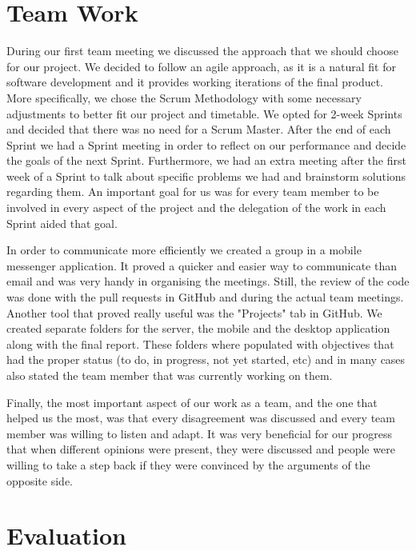 \documentclass[11pt]{article}
\begin{document}

\section{Team Work}

During our first team meeting we discussed the approach that we should choose for our project. We decided to follow an agile approach, as it is a natural fit for software development and it provides working iterations of the final product. More specifically, we chose the Scrum Methodology \cite{rising:00} with some necessary adjustments to better fit our project and timetable. We opted for 2-week Sprints and decided that there was no need for a Scrum Master. After the end of each Sprint we had a Sprint meeting in order to reflect on our performance and decide the goals of the next Sprint. Furthermore, we had an extra meeting after the first week of a Sprint to talk about specific problems we had and brainstorm solutions regarding them. An important goal for us was for every team member to be involved in every aspect of the project and the delegation of the work in each Sprint aided that goal.

In order to communicate more efficiently we created a group in a mobile messenger application. It proved a quicker and easier way to communicate than email and was very handy in organising the meetings. Still, the review of the code was done with the pull requests in GitHub and during the actual team meetings. Another tool that proved really useful was the "Projects" tab in GitHub. We created separate folders for the server, the mobile and the desktop application along with the final report. These folders where populated with objectives that had the proper status (to do, in progress, not yet started, etc) and in many cases also stated the team member that was currently working on them.

Finally, the most important aspect of our work as a team, and the one that helped us the most, was that every disagreement was discussed and every team member was willing to listen and adapt. It was very beneficial for our progress that when different opinions were present, they were discussed and people were willing to take a step back if they were convinced by the arguments of the opposite side.


\section{Evaluation}
\end{document}
